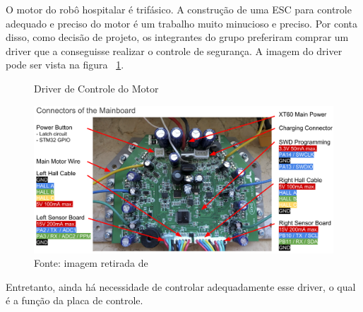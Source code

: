 \documentclass[../delivery_hospital_report.tex]{subfiles}
\begin{document}
O motor do robô hospitalar é trifásico. A construção de uma ESC para controle adequado e preciso do motor é um trabalho muito minucioso e preciso. Por conta disso, como decisão de projeto, os integrantes do grupo preferiram comprar um driver que a conseguisse realizar o controle de segurança. A imagem do driver pode ser vista na figura ~\ref{fig:Driver de Controle do Motor}.

\begin{figure}[h]
\centering
    \caption{Driver de Controle do Motor}
    \centering %
    \includegraphics[width=15cm]{driver_motor.png}
    \caption*{Fonte: imagem retirada de \cite{drivermotor21}}
    \label{fig:Driver de Controle do Motor}
\end{figure}

Entretanto, ainda há necessidade de controlar adequadamente esse driver, o qual é a função da placa de controle.
\end{document}
